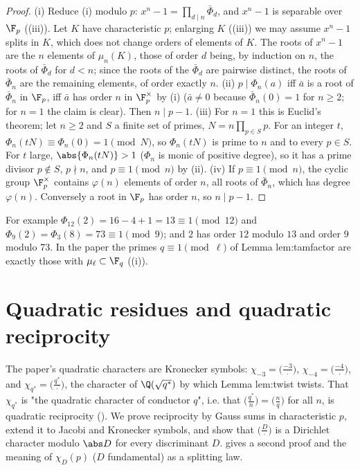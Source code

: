 \begin{proof}
(i) Reduce (i) modulo $p$: $x^n-1=\prod_{d\mid n}\bar\Phi_d$, and $x^n-1$ is separable over $\F_p$
((iii)). Let $K$ have characteristic $p$; enlarging $K$ ((iii)) we may assume $x^n-1$
splits in $K$, which does not change orders of elements of $K$. The roots of $x^n-1$ are the $n$ elements of $\mu_n(K)$, those of order $d$
being, by induction on $n$, the roots of $\bar\Phi_d$ for $d<n$; since the roots of the $\bar\Phi_d$ are pairwise distinct, the roots of $\bar\Phi_n$ are
the remaining elements, of order exactly $n$.
(ii) $p\mid\Phi_n(a)$ iff $\bar a$ is a root of $\bar\Phi_n$ in $\F_p$, iff $\bar a$ has order $n$ in $\F_p^\times$ by (i) ($\bar a\ne0$ because $\bar\Phi_n(0)=1$ for $n\ge2$; for
$n=1$ the claim is clear). Then $n\mid p-1$.
(iii) For $n=1$ this is Euclid's theorem; let $n\ge2$ and $S$ a finite set of primes, $N=n\prod_{p\in S}p$. For an integer $t$, $\Phi_n(tN)\equiv\Phi_n(0)=1\pmod N$,
so $\Phi_n(tN)$ is prime to $n$ and to every $p\in S$. For $t$ large, $\abs{\Phi_n(tN)}>1$ ($\Phi_n$ is monic of positive degree), so it has a prime
divisor $p\notin S$, $p\nmid n$, and $p\equiv1\pmod n$ by (ii).
(iv) If $p\equiv1\pmod n$, the cyclic group $\F_p^\times$ contains $\varphi(n)$ elements of order $n$, all roots of $\bar\Phi_n$, which has degree $\varphi(n)$.
Conversely a root in $\F_p$ has order $n$, so $n\mid p-1$.
\end{proof}

For example $\Phi_{12}(2)=16-4+1=13\equiv1\pmod{12}$ and $\Phi_9(2)=\Phi_3(8)=73\equiv1\pmod9$; and $2$ has order $12$ modulo $13$ and order $9$ modulo $73$.
In the paper the primes $q\equiv1\pmod\ell$ of Lemma lem:tamfactor are exactly those with $\mu_\ell\subset\F_q$ ((i)).

\section{Quadratic residues and quadratic reciprocity}\label{sec:rings:qr}

The paper's quadratic characters are Kronecker symbols: $\chi_{-3}=\bigl(\frac{-3}\cdot\bigr)$, $\chi_{-4}=\bigl(\frac{-4}\cdot\bigr)$, and $\chi_{q^*}=\bigl(\frac{q^*}\cdot\bigr)$, the
character of $\Q(\sqrt{q^*})$ by which Lemma lem:twist twists. That $\chi_{q^*}$ is "the quadratic character of conductor $q$", i.e. that
$\bigl(\frac{q^*}n\bigr)=\bigl(\frac nq\bigr)$ for all $n$, is quadratic reciprocity (). We prove reciprocity by Gauss sums in
characteristic $p$, extend it to Jacobi and Kronecker symbols, and show that $\bigl(\frac D\cdot\bigr)$ is a Dirichlet character modulo $\abs D$ for every
discriminant $D$.  gives a second proof and the meaning of $\chi_D(p)$ ($D$ fundamental) as a splitting law.

